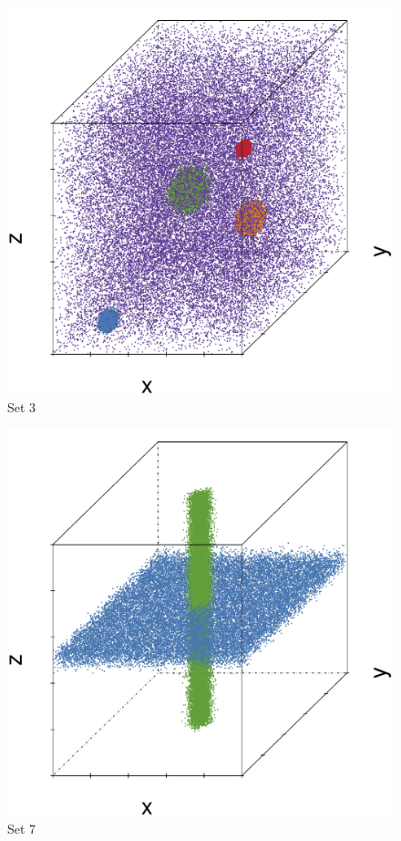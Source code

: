 \begin{subfigure}{0.23\textwidth}
	\centering
	\includegraphics[width=\textwidth]{3/img/datasetplot_ferdosi_3_120000.pdf}
	\caption{Set 3}
	\label{fig:3:simulated:datasets:ferdosi3}
\end{subfigure}	
\begin{subfigure}{0.23\textwidth}
	\centering
	\includegraphics[width=\textwidth]{3/img/datasetplot_ferdosi_4_60000.pdf}
	\caption{Set 7}
	\label{fig:3:simulated:datasets:ferdosi4}
\end{subfigure}
